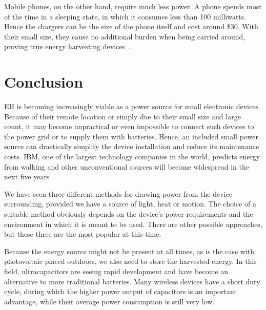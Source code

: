 \documentclass[a4paper,10pt]{article}
\begin{document}
Mobile phones, on the other hand, require much less power. A phone spends most of the time in a sleeping state, in which it consumes less than 100 milliwatts. Hence the chargers can be the size of the phone itself and cost around \$30. With their small size, they cause no additional burden when being carried around, proving true energy harvesting devices~\cite{mysolarphonecharger}. 


\section{Conclusion}

\acf{EH} is becoming increasingly viable as a power source for small electronic devices. Because of their remote location or simply due to their small size and large count, it may become impractical or even impossible to connect such devices to the power grid or to supply them with batteries. Hence, an included small power source can drastically simplify the device installation and reduce its maintenance costs. \acs{IBM}, one of the largest technology companies in the world, predicts energy from walking and other unconventional sources will become widespread in the next five years~\cite{ibm:5in5}. 

We have seen three different methods for drawing power from the device surrounding, provided we have a source of light, heat or motion. The choice of a suitable method obviously depends on the device's power requirements and the environment in which it is meant to be used. There are other possible approaches, but these three are the most popular at this time. 

Because the energy source might not be present at all times, as is the case with photovoltaic placed outdoors, we also need to store the harvested energy. In this field, ultracapacitors are seeing rapid development and have become an alternative to more traditional batteries. Many wireless devices have a short duty cycle, during which the higher power output of capacitors is an important advantage, while their average power consumption is still very low. 

\newpage


 
\end{document}
